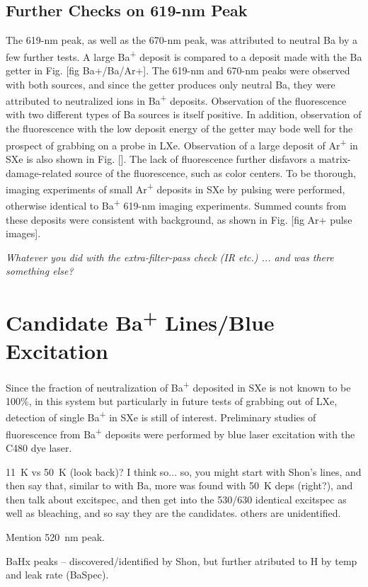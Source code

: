 \subsection{Further Checks on 619-nm Peak}
\label{subsec:619identification}

The 619-nm peak, as well as the 670-nm peak, was attributed to neutral Ba by a few further tests.  A large Ba\textsuperscript{+} deposit is compared to a deposit made with the Ba getter in Fig. [fig Ba+/Ba/Ar+].  The 619-nm and 670-nm peaks were observed with both sources, and since the getter produces only neutral Ba, they were attributed to neutralized ions in Ba\textsuperscript{+} deposits.  Observation of the fluorescence with two different types of Ba sources is itself positive.  In addition, observation of the fluorescence with the low deposit energy of the getter may bode well for the prospect of grabbing on a probe in LXe.  Observation of a large deposit of Ar\textsuperscript{+} in SXe is also shown in Fig. [].  The lack of fluorescence further disfavors a matrix-damage-related source of the fluorescence, such as color centers.  To be thorough, imaging experiments of small Ar\textsuperscript{+} deposits in SXe by pulsing were performed, otherwise identical to Ba\textsuperscript{+} 619-nm imaging experiments.  Summed counts from these deposits were consistent with background, as shown in Fig. [fig Ar+ pulse images].

\emph{\color{gray}Whatever you did with the extra-filter-pass check (IR etc.) ... and was there something else?}


\section{Candidate Ba\textsuperscript{+} Lines/Blue Excitation}
\label{sec:BaPlus}

Since the fraction of neutralization of Ba\textsuperscript{+} deposited in SXe is not known to be 100\%, in this system but particularly in future tests of grabbing out of LXe, detection of single Ba\textsuperscript{+} in SXe is still of interest.  Preliminary studies of fluorescence from Ba\textsuperscript{+} deposits were performed by blue laser excitation with the C480 dye laser.

11~K vs 50~K (look back)?  I think so... so, you might start with Shon's lines, and then say that, similar to with Ba, more was found with 50~K deps (right?), and then talk about excitspec, and then get into the 530/630 identical excitspec as well as bleaching, and so say they are the candidates.  others are unidentified.

Mention 520~nm peak.

BaHx peaks -- discovered/identified by Shon, but further atributed to H by temp and leak rate (BaSpec).